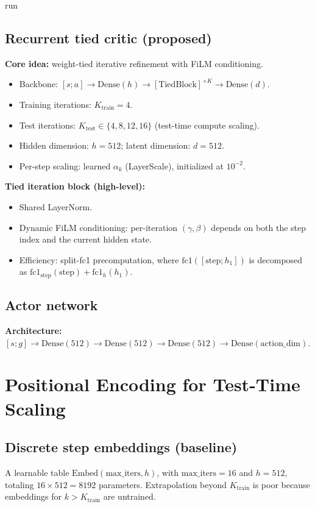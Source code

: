 run\documentclass[11pt]{article}
\begin{document}
\subsection{Recurrent tied critic (proposed)}
\textbf{Core idea:} weight-tied iterative refinement with FiLM conditioning.
\begin{itemize}
  \item Backbone: $[s;a] \to \mathrm{Dense}(h) \to [\mathrm{TiedBlock}]^{\times K} \to \mathrm{Dense}(d)$.
  \item Training iterations: $K_{\text{train}}=4$.
  \item Test iterations: $K_{\text{test}}\in\{4,8,12,16\}$ (test-time compute scaling).
  \item Hidden dimension: $h=512$; latent dimension: $d=512$.
  \item Per-step scaling: learned $\alpha_k$ (LayerScale), initialized at $10^{-2}$.
\end{itemize}

\textbf{Tied iteration block (high-level):}
\begin{itemize}
  \item Shared LayerNorm.
  \item Dynamic FiLM conditioning: per-iteration $(\gamma,\beta)$ depends on both the step index and the current hidden state.
  \item Efficiency: split-fc1 precomputation, where $\mathrm{fc1}([\text{step};h_1])$ is decomposed as \mbox{$\mathrm{fc1}_{\text{step}}(\text{step}) + \mathrm{fc1}_{h}(h_1)$}.
\end{itemize}


\subsection{Actor network}
\textbf{Architecture:} $[s;g] \to \mathrm{Dense}(512) \to \mathrm{Dense}(512) \to \mathrm{Dense}(512) \to \mathrm{Dense}(\mathrm{action\_dim})$.

\section{Positional Encoding for Test-Time Scaling}
\subsection{Discrete step embeddings (baseline)}
A learnable table $\mathrm{Embed}(\mathrm{max\_iters}, h)$, with $\mathrm{max\_iters}=16$ and $h=512$, totaling $16\times 512 = 8192$ parameters. Extrapolation beyond $K_{\text{train}}$ is poor because embeddings for $k > K_{\text{train}}$ are untrained.
\end{document}
